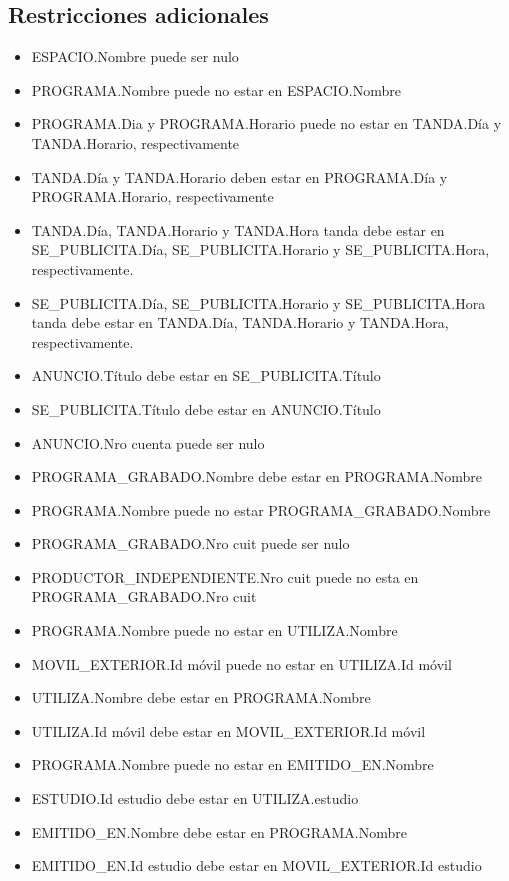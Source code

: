 \documentclass[a4paper,10pt]{article}
\begin{document}
  \subsection{Restricciones adicionales}
    \begin{itemize}
     \item ESPACIO.Nombre puede ser nulo
     \item PROGRAMA.Nombre puede no estar en ESPACIO.Nombre
     
     \item PROGRAMA.Dia y PROGRAMA.Horario puede no estar en TANDA.D\'ia y TANDA.Horario, respectivamente
     \item TANDA.D\'ia y TANDA.Horario deben estar en PROGRAMA.D\'ia y PROGRAMA.Horario, respectivamente
     
     \item TANDA.D\'ia, TANDA.Horario y TANDA.Hora tanda debe estar en \newline SE\_PUBLICITA.D\'ia, SE\_PUBLICITA.Horario 
      y SE\_PUBLICITA.Hora, respectivamente.
     \item SE\_PUBLICITA.D\'ia, SE\_PUBLICITA.Horario y SE\_PUBLICITA.Hora \newline tanda debe estar en TANDA.D\'ia, TANDA.Horario 
      y TANDA.Hora, respectivamente.
     \item ANUNCIO.T\'itulo debe estar en SE\_PUBLICITA.T\'itulo
     \item SE\_PUBLICITA.T\'itulo debe estar en ANUNCIO.T\'itulo
     
     \item ANUNCIO.Nro cuenta puede ser nulo

     \item PROGRAMA\_GRABADO.Nombre debe estar en PROGRAMA.Nombre
     \item PROGRAMA.Nombre puede no estar PROGRAMA\_GRABADO.Nombre

     \item PROGRAMA\_GRABADO.Nro cuit puede ser nulo
     \item PRODUCTOR\_INDEPENDIENTE.Nro cuit puede no esta en PROGRAMA\_GRABADO.Nro cuit

     \item PROGRAMA.Nombre puede no estar en UTILIZA.Nombre
     \item MOVIL\_EXTERIOR.Id m\'ovil puede no estar en UTILIZA.Id m\'ovil
     \item UTILIZA.Nombre debe estar en PROGRAMA.Nombre
     \item UTILIZA.Id m\'ovil debe estar en MOVIL\_EXTERIOR.Id m\'ovil

     \item PROGRAMA.Nombre puede no estar en EMITIDO\_EN.Nombre
     \item ESTUDIO.Id estudio debe estar en UTILIZA.estudio
     \item EMITIDO\_EN.Nombre debe estar en PROGRAMA.Nombre
     \item EMITIDO\_EN.Id estudio debe estar en MOVIL\_EXTERIOR.Id estudio
    \end{itemize}
\end{document}
